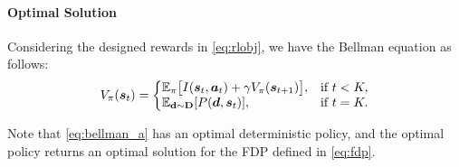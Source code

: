 \documentclass{article} %
\newtheorem{remark}{Remark}
\begin{document}
    

\vspace{-3mm}
\paragraph{Optimal Solution}
Considering the designed rewards in \eqref{eq:rlobj}, we have the Bellman equation as follows:
\begin{equation}\label{eq:bellman_a}
   V_{\pi}(\sv_t) = 
   \left\{
   \begin{array}{@{}ll@{}}
     \mathbb{E}_{\pi} \big[ I(\sv_t, \av_t)+ \gamma V_{\pi} (\sv_{t+1}) \big], & \text{if}\ t<\K, \\
     \Ex_{\mathbf{d}\sim \mathbf{D}}[P(\bd, \sv_t)], & \text{if}\  t = \K.
   \end{array}\right.
 \end{equation}
 
Note that \eqref{eq:bellman_a} has an optimal deterministic policy, and the optimal policy returns an optimal solution for the FDP defined in \eqref{eq:fdp}.
\end{document}
